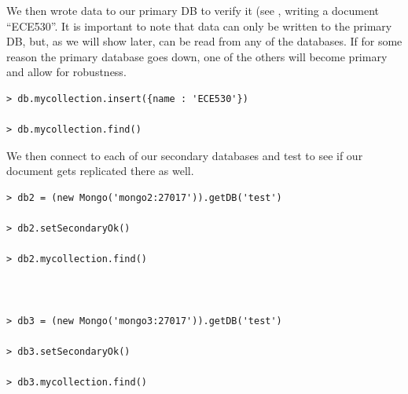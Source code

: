 \documentclass{article}
\begin{document}
We then wrote data to our primary DB to verify it (see , writing a document ``ECE530''. It is important to note that data can only be written to the primary DB, but, as we will show later, can be read from any of the databases. If for some reason the primary database goes down, one of the others will become primary and allow for robustness.

\begin{tcolorbox}[colback=CrispBlue!5!white,colframe=CrispBlue!75!black,title=Write data to \texttt{mongo1} -- our primary DB and then read it]
\begin{verbatim}
> db.mycollection.insert({name : 'ECE530'})

> db.mycollection.find()
\end{verbatim}
\end{tcolorbox}



\newpage
We then connect to each of our secondary databases and test to see if our document gets replicated there as well.

\begin{tcolorbox}[colback=CrispBlue!5!white,colframe=CrispBlue!75!black,title=Test that data is being replicated to \texttt{mongo2} and \texttt{mongo3} respectively]
\begin{verbatim}
> db2 = (new Mongo('mongo2:27017')).getDB('test')

> db2.setSecondaryOk()

> db2.mycollection.find()



> db3 = (new Mongo('mongo3:27017')).getDB('test')

> db3.setSecondaryOk()

> db3.mycollection.find()
\end{verbatim}
\end{tcolorbox}

\end{document}
